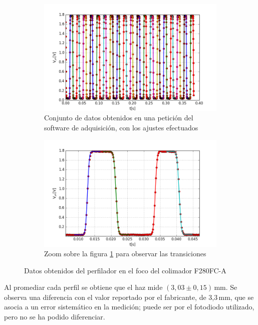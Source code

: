\begin{figure}[H]
    \begin{subfigure}[b]{0.5\textwidth}
        \centering
        \includegraphics[width=\textwidth]{fig/perfilador/spim_foco}
        \caption{Conjunto de datos obtenidos en una petición del software de adquisición, con los ajustes efectuados}
        \label{fig:perfilador/spim_foco}
    \end{subfigure}
    \begin{subfigure}[b]{.5\textwidth}
        \centering
        \includegraphics[width=\textwidth]{fig/perfilador/spim_foco_zoom}
        \caption{Zoom sobre la figura \ref{fig:perfilador/spim_foco} para observar las transiciones}
        \label{fig:perfilador/spim_foco_zoom}
    \end{subfigure}
    \caption{Datos obtenidos del perfilador en el foco del colimador F280FC-A}
\end{figure}

Al promediar cada perfil se obtiene que el haz mide $(3,03\pm0,15)\,$mm. Se observa una diferencia con el valor reportado por el fabricante, de 3,3$\,$mm, que se asocia a un error sistemático en la medición; puede ser por el fotodiodo utilizado, pero no se ha podido diferenciar. 

